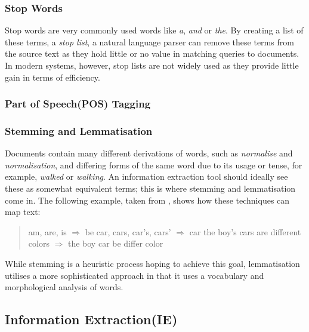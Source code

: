 \subsubsection{Stop Words}
Stop words are very commonly used words like \emph{a}, \emph{and} or \emph{the}. By creating a list of these terms, a \emph{stop list}, a natural language parser can remove these terms from the source text as they hold little or no value in matching queries to documents. In modern systems, however, stop lists are not widely used as they provide little gain in terms of efficiency\cite{manning2008}.

\subsubsection{Part of Speech(POS) Tagging}

\subsubsection{Stemming and Lemmatisation}
Documents contain many different derivations of words, such as \emph{normalise} and \emph{normalisation}, and differing forms of the same word due to its usage or tense, for example, \emph{walked} or \emph{walking}. An information extraction tool should ideally see these as somewhat equivalent terms; this is where stemming and lemmatisation come in. The following example, taken from \cite{manning2008}, shows how these techniques can map text:

\begin{quote}
am, are, is \begin{math}\Rightarrow\end{math} be 
\newline
car, cars, car's, cars' \begin{math}\Rightarrow\end{math} car
\newline
\newline
the boy's cars are different colors  \begin{math}\Rightarrow \end{math}
\newline
the boy car be differ color
\end{quote}

While stemming is a heuristic process hoping to achieve this goal, lemmatisation utilises a more sophisticated approach in that it uses a vocabulary and morphological analysis of words.

\subsection[Information Extraction]{Information Extraction(IE)}

